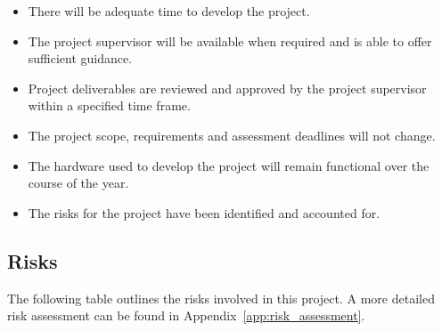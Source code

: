 \documentclass[
	fontsize=11pt
	headlines=2,
	footlines=2,
	parskip=half
]{scrartcl}
\begin{document}
{{			%
			\begin{itemize}
				\item There will be adequate time to develop the project.
				\item The project supervisor will be available when required and is able to offer sufficient guidance.
				\item Project deliverables are reviewed and approved by the project supervisor within a specified time frame.
				\item The project scope, requirements and assessment deadlines will not change.
				\item The hardware used to develop the project will remain functional over the course of the year.
				\item The risks for the project have been identified and accounted for.
			\end{itemize}
		
		}
		
		\subsection{Risks} {
		\label{sec:risks}

			The following table outlines the risks involved in this project. A more detailed risk assessment can be found in Appendix~\ref{app:risk_assessment}.
			
}}
\end{document}
